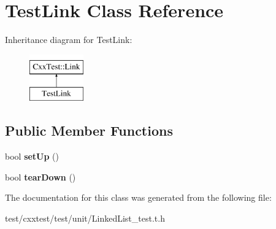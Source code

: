 \hypertarget{classTestLink}{\section{Test\-Link Class Reference}
\label{classTestLink}
}
Inheritance diagram for Test\-Link\-:\begin{figure}[H]
\begin{center}
\leavevmode
\includegraphics[height=2.000000cm]{classTestLink}
\end{center}
\end{figure}
\subsection*{Public Member Functions}
\begin{DoxyCompactItemize}
\item 
\hypertarget{classTestLink_aeef9c3af36f342f408b09d7b9eb43b2e}{bool {\bfseries set\-Up} ()}\label{classTestLink_aeef9c3af36f342f408b09d7b9eb43b2e}

\item 
\hypertarget{classTestLink_ae28ab5ede508b67414be89d4e2cb4eac}{bool {\bfseries tear\-Down} ()}\label{classTestLink_ae28ab5ede508b67414be89d4e2cb4eac}

\end{DoxyCompactItemize}


The documentation for this class was generated from the following file\-:\begin{DoxyCompactItemize}
\item 
test/cxxtest/test/unit/Linked\-List\-\_\-test.\-t.\-h\end{DoxyCompactItemize}
